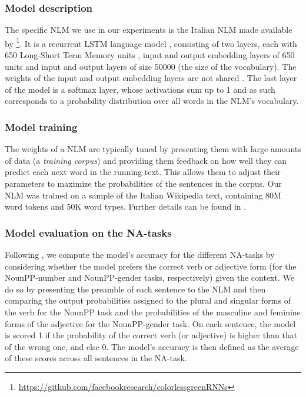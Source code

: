 \subsubsection{Model description}
The specific NLM we use in our experiments is the Italian NLM made available by \citet{Gulordava:etal:2018}\footnote{\url{https://github.com/facebookresearch/colorlessgreenRNNs}}.
It is a recurrent LSTM language model \citep{Graves:2012}, consisting of two layers, each with 650 Long-Short Term Memory units  \citep{Hochreiter:Schmidhuber:1997}, input and output embedding layers of 650 units and input and output layers of size 50000 (the size of the vocabulary). 
The weights of the input and output embedding layers are not shared \citep{press2016using}.
The last layer of the model is a softmax layer, whose activations sum up to 1 and as such corresponds to a probability distribution over all words in the NLM's vocabulary. 

\subsubsection{Model training}
The weights of a NLM are typically tuned by presenting them with large amounts of data (a \emph{training corpus}) and providing them feedback on how well they can predict each next word in the running text. This allows them to adjust their parameters to maximize the probabilities of the sentences in the corpus. %
Our NLM was trained on a sample of the Italian Wikipedia text, containing 80M word tokens and 50K word types. Further details can be found in \citet{Gulordava:etal:2018}.


\subsubsection{Model evaluation on the NA-tasks}
Following \citet{Linzen:etal:2016}, we compute the model's accuracy for the different NA-tasks by considering whether the model prefers the correct verb or adjective form (for the NounPP-number and NounPP-gender tasks, respectively) given the context. We do so by presenting the preamble of each sentence to the NLM and then comparing the output probabilities assigned to the plural and singular forms of the verb for the NounPP task and the probabilities of the masculine and feminine forms of the adjective for the NounPP-gender task. On each sentence, the model is scored 1 if the probability of the correct verb (or adjective) is higher than that of the wrong one, and else 0. 
The model's accuracy is then defined as the average of these scores across all sentences in the NA-task. 

